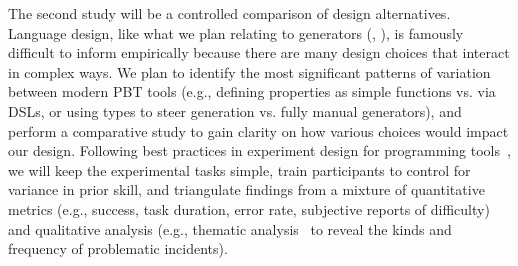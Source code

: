 The second study will be a controlled comparison of design alternatives.
Language design, like what we plan relating to generators
(, ), is famously
difficult to inform empirically because there are many design choices
that interact in complex ways. We plan to identify the most
significant patterns of
variation between modern PBT tools (e.g., defining properties as simple
functions vs. via DSLs, or using types to steer
generation vs.{} fully manual generators), and perform a comparative
study to gain clarity on how various
choices would impact our design. Following best practices in experiment design
for programming tools~\cite{ref:ko2015practical}, we will keep the experimental tasks simple, train
participants to control for variance in prior skill, and triangulate findings
from a mixture of
quantitative metrics (e.g., success, task duration, error rate, subjective
reports of difficulty) and qualitative analysis (e.g., thematic
analysis~\cite{ref:blandford2016qualitative} to reveal the kinds and frequency
of problematic incidents).



